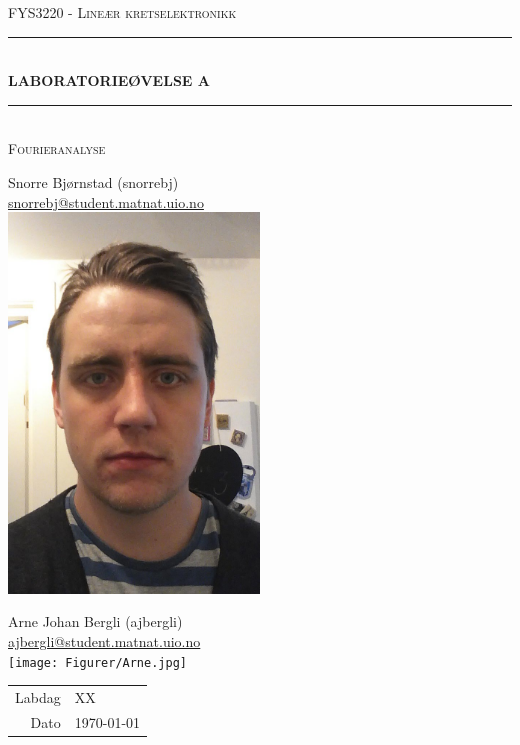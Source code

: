 \documentclass[norsk, a4paper]{article}
\begin{document}
\begin{titlepage}
\begin{center}

\textsc{\Large FYS3220 - Lineær kretselektronikk}\\[0.5cm]
\rule{\linewidth}{0.5mm} \\[0.4cm]
{ \huge \bfseries  LABORATORIEØVELSE A}\\[0.10cm]
\rule{\linewidth}{0.5mm} \\[1.5cm]

\textsc{\Large Fourieranalyse}\\[1.5cm]

\begin{minipage}{0.49\textwidth}
    \begin{center} \large
        Snorre Bjørnstad (snorrebj)\\ \url{snorrebj@student.matnat.uio.no} \\[0.8cm]
        \includegraphics[width = 0.5\textwidth ]{Figurer/snorre.jpg}
    \end{center}
\end{minipage}
\begin{minipage}{0.49\textwidth}
    \begin{center} \large
        Arne Johan Bergli (ajbergli)\\ \url{ajbergli@student.matnat.uio.no} \\[0.8cm]
        \texttt{[image: Figurer/Arne.jpg]}
    \end{center}
\end{minipage}

\vfill

\large{
\begin{tabular}{r@{: }l}
Labdag & XX \\
Dato & \today
\end{tabular}
}

\end{center}
\end{titlepage}
\end{document}
